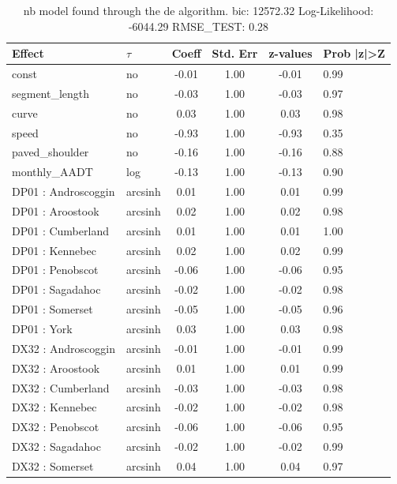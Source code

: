 \begin{table}
	\caption{nb model found through the de algorithm. bic: 12572.32 Log-Likelihood: -6044.29 RMSE_TEST: 0.28}
	\begin{center}
		\begin{tabular}{|l|l|c|c|c|l|}
			\hline
			Effect & $\tau$ & Coeff & Std. Err & z-values & Prob |z|>Z \\
			\hline
			const & no & -0.01 & 1.00 & -0.01 & 0.99 \\
			\hline
			segment_length & no & -0.03 & 1.00 & -0.03 & 0.97 \\
			\hline
			curve & no & 0.03 & 1.00 & 0.03 & 0.98 \\
			\hline
			speed & no & -0.93 & 1.00 & -0.93 & 0.35 \\
			\hline
			paved_shoulder & no & -0.16 & 1.00 & -0.16 & 0.88 \\
			\hline
			monthly_AADT & log & -0.13 & 1.00 & -0.13 & 0.90 \\
			\hline
			DP01 : Androscoggin & arcsinh & 0.01 & 1.00 & 0.01 & 0.99 \\
			\hline
			DP01 : Aroostook & arcsinh & 0.02 & 1.00 & 0.02 & 0.98 \\
			\hline
			DP01 : Cumberland & arcsinh & 0.01 & 1.00 & 0.01 & 1.00 \\
			\hline
			DP01 : Kennebec & arcsinh & 0.02 & 1.00 & 0.02 & 0.99 \\
			\hline
			DP01 : Penobscot & arcsinh & -0.06 & 1.00 & -0.06 & 0.95 \\
			\hline
			DP01 : Sagadahoc & arcsinh & -0.02 & 1.00 & -0.02 & 0.98 \\
			\hline
			DP01 : Somerset & arcsinh & -0.05 & 1.00 & -0.05 & 0.96 \\
			\hline
			DP01 : York & arcsinh & 0.03 & 1.00 & 0.03 & 0.98 \\
			\hline
			DX32 : Androscoggin & arcsinh & -0.01 & 1.00 & -0.01 & 0.99 \\
			\hline
			DX32 : Aroostook & arcsinh & 0.01 & 1.00 & 0.01 & 0.99 \\
			\hline
			DX32 : Cumberland & arcsinh & -0.03 & 1.00 & -0.03 & 0.98 \\
			\hline
			DX32 : Kennebec & arcsinh & -0.02 & 1.00 & -0.02 & 0.98 \\
			\hline
			DX32 : Penobscot & arcsinh & -0.06 & 1.00 & -0.06 & 0.95 \\
			\hline
			DX32 : Sagadahoc & arcsinh & -0.02 & 1.00 & -0.02 & 0.99 \\
			\hline
			DX32 : Somerset & arcsinh & 0.04 & 1.00 & 0.04 & 0.97 \\

\end{tabular}
\end{center}
\end{table}
